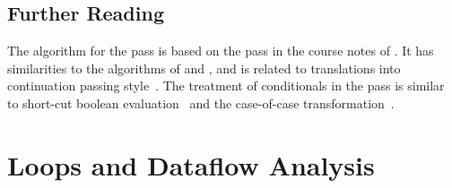 \documentclass[7x10]{TimesAPriori_MIT}%
\numberwithin{theorem}{chapter}
\numberwithin{definition}{chapter}
\numberwithin{equation}{chapter}
\begin{document}
\section{Further Reading}
\label{sec:cond-further-reading}

The algorithm for the  pass is based on the
 pass in the course notes of
\citet{Dybvig:2010aa}.
%
It has similarities to the algorithms of \citet{Danvy:2003fk} and
\citet{Appel:2003fk}, and is related to translations into continuation
passing
style~\citep{Wijngaarden:1966,Fischer:1972,reynolds72:_def_interp,Plotkin:1975,Friedman:2001}.
%
The treatment of conditionals in the  pass is
similar to short-cut boolean
evaluation~\citep{Logothetis:1981,Aho:2006wb,Clarke:1989,Danvy:2003fk}
and the case-of-case transformation~\citep{PeytonJones:1998}.

\chapter{Loops and Dataflow Analysis}
\label{ch:Lwhile}
\setcounter{footnote}{0}


\end{document}
